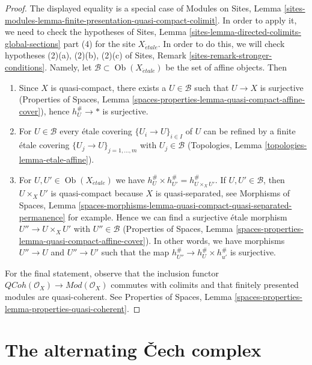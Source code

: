 \documentclass{stacks-project}
\theoremstyle{plain}
\theoremstyle{definition}
\theoremstyle{remark}
\numberwithin{equation}{subsection}
\def\Ob{\mathop{\mathrm{Ob}}\nolimits}
\def\etale{{\acute{e}tale}}
\def\QCoh{\mathit{QCoh}}
\begin{document}
\begin{proof}
The displayed equality is a special case of Modules on Sites, Lemma
\ref{sites-modules-lemma-finite-presentation-quasi-compact-colimit}.
In order to apply it, we need to check the hypotheses of
Sites, Lemma \ref{sites-lemma-directed-colimits-global-sections} part (4)
for the site $X_\etale$.
In order to do this, we will check hypotheses
(2)(a), (2)(b), (2)(c) of
Sites, Remark \ref{sites-remark-stronger-conditions}.
Namely, let $\mathcal{B} \subset \Ob(X_\etale)$ be the set of affine objects.
Then
\begin{enumerate}
\item Since $X$ is quasi-compact, there exists a $U \in \mathcal{B}$
such that $U \to X$ is surjective
(Properties of Spaces, Lemma
\ref{spaces-properties-lemma-quasi-compact-affine-cover}),
hence $h_U^\# \to *$ is surjective.
\item For $U \in \mathcal{B}$ every \'etale covering $\{U_i \to U\}_{i \in I}$
of $U$ can be refined by a finite \'etale covering
$\{U_j \to U\}_{j = 1, \ldots, m}$ with $U_j \in \mathcal{B}$
(Topologies, Lemma \ref{topologies-lemma-etale-affine}).
\item For $U, U' \in \Ob(X_\etale)$ we have
$h_U^\# \times h_{U'}^\# = h_{U \times_X U'}^\#$.
If $U, U' \in \mathcal{B}$, then $U \times_X U'$ is quasi-compact
because $X$ is quasi-separated, see Morphisms of Spaces, Lemma
\ref{spaces-morphisms-lemma-quasi-compact-quasi-separated-permanence}
for example. Hence we can find a surjective \'etale morphism
$U'' \to U \times_X U'$ with $U'' \in \mathcal{B}$
(Properties of Spaces, Lemma
\ref{spaces-properties-lemma-quasi-compact-affine-cover}).
In other words, we have morphisms $U'' \to U$ and $U'' \to U'$
such that the map $h_{U''}^\# \to h_U^\# \times h_{u'}^\#$ is
surjective.
\end{enumerate}
For the final statement, observe that the inclusion functor
$\QCoh(\mathcal{O}_X) \to \textit{Mod}(\mathcal{O}_X)$
commutes with colimits and that finitely presented modules
are quasi-coherent. See
Properties of Spaces, Lemma
\ref{spaces-properties-lemma-properties-quasi-coherent}.
\end{proof}





\section{The alternating {\v C}ech complex}
\label{section-alternating-cech}
\end{document}
